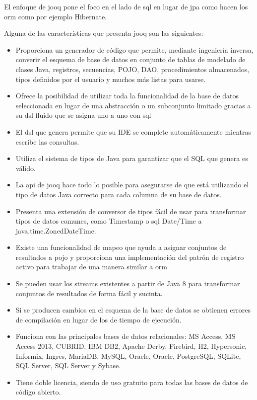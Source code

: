 El enfoque de \acrshort{jooq} pone el foco en el lado de \acrfull{sql} en lugar de \acrshort{jpa} como hacen los \acrfull{orm} como por ejemplo Hibernate.

Alguna de las características que presenta \acrshort{jooq} son las siguientes\citep{VentajasJooq}:
\begin{itemize}
\item Proporciona un generador de código que permite, mediante ingeniería inversa, converir el esquema de base de datos en conjunto de tablas de modelado de clases Java, registros, secuencias, POJO, DAO, procedimientos almacenados, tipos definidos por el usuario y muchos más listas para usarse. 
\item Ofrece la posibilidad de utilizar toda la funcionalidad de la base de datos seleccionada en lugar de una abstracción o un subconjunto limitado gracias a su \acrfull{dsl} fluido que se asigna uno a uno con \acrshort{sql}
\item El \acrfull{dsl} que genera permite que su IDE se complete automáticamente mientras escribe las consultas.
\item Utiliza el sistema de tipos de Java para garantizar que el SQL que genera es válido.
\item La \acrshort{api} de \acrshort{jooq} hace todo lo posible para asegurarse de que está utilizando el tipo de datos Java correcto para cada columna de su base de datos. 
\item Presenta una extensión de conversor de tipos fácil de usar para transformar tipos de datos comunes, como Timestamp o \acrshort{sql} Date/Time a java.time.ZonedDateTime.
\item Existe una funcionalidad de mapeo que ayuda a asignar conjuntos de resultados a \acrfull{pojo} y proporciona una implementación del patrón de registro activo para trabajar de una manera similar a \acrshort{orm}
\item Se pueden usar los streams existentes a partir de Java 8 para transformar conjuntos de resultados de forma fácil y sucinta.
\item Si se producen cambios en el esquema de la base de datos se obtienen errores de compilación en lugar de los de tiempo de ejecución.
\item Funciona con las principales bases de datos relacionales: MS Access, MS Access 2013, CUBRID, IBM DB2, Apache Derby, Firebird, H2, Hypersonic, Informix, Ingres, MariaDB, MySQL, Oracle, Oracle, PostgreSQL, SQLite, SQL Server, SQL Server y Sybase.
\item Tiene doble licencia, siendo de uso gratuito para todas las bases de datos de código abierto.
\end{itemize}

